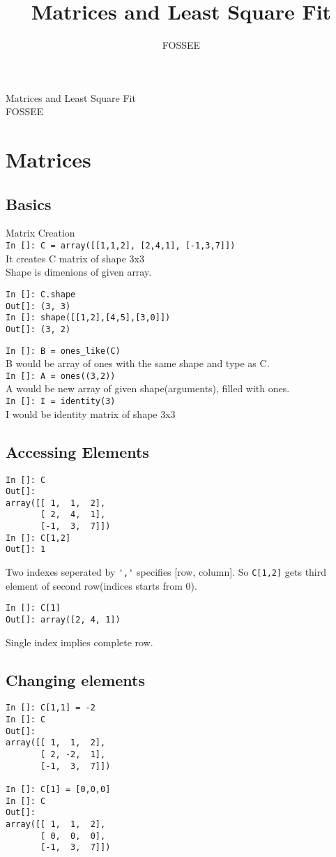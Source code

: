 \documentclass[12pt]{article}
\title{Matrices and Least Square Fit}
\author{FOSSEE}
\newcommand{\typ}[1]{\lstinline{#1}}
\begin{document}
\date{}
\vspace{-1in}
\begin{center}
\LARGE{Matrices and Least Square Fit}\\
\large{FOSSEE}
\end{center}
\section{Matrices}
\subsection{Basics}
Matrix Creation\\
\typ{In []: C = array([[1,1,2], [2,4,1], [-1,3,7]])}\\
It creates C matrix of shape 3x3\\
Shape is dimenions of given array.
\begin{lstlisting}
In []: C.shape 
Out[]: (3, 3)
In []: shape([[1,2],[4,5],[3,0]])
Out[]: (3, 2)
\end{lstlisting}
\typ{In []: B = ones_like(C)} \\
B would be array of ones with the same shape and type as C.\\
\typ{In []: A = ones((3,2))} \\
A would be new array of given shape(arguments), filled with ones.\\ 
\typ{In []: I = identity(3)}\\
I would be identity matrix of shape 3x3

\subsection{Accessing Elements}
\begin{lstlisting}
In []: C
Out[]: 
array([[ 1,  1,  2],
       [ 2,  4,  1],
       [-1,  3,  7]])
In []: C[1,2]
Out[]: 1
\end{lstlisting}
Two indexes seperated by \typ{','} specifies [row, column]. So \typ{C[1,2]} gets third element of second row(indices starts from 0).
\newpage
\begin{lstlisting}
In []: C[1]
Out[]: array([2, 4, 1])
\end{lstlisting}
Single index implies complete row.
\subsection{Changing elements}
\begin{lstlisting}
In []: C[1,1] = -2
In []: C
Out[]: 
array([[ 1,  1,  2],
       [ 2, -2,  1],
       [-1,  3,  7]])

In []: C[1] = [0,0,0]
In []: C
Out[]: 
array([[ 1,  1,  2],
       [ 0,  0,  0],
       [-1,  3,  7]])
\end{lstlisting}
\end{document}
